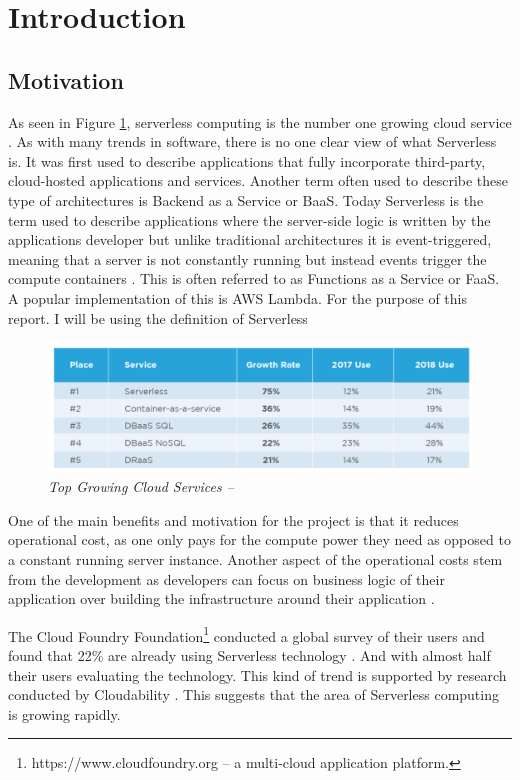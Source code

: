\section{Introduction}
\subsection{Motivation}
\label{sub:motivation}
As seen in Figure \ref{img:strend}, serverless computing is the number one growing cloud service \citep{survey_2018}. As with many trends in software, there is no one clear view of what \gls{Serverless} is. It was first used to describe applications that fully incorporate  third-party, cloud-hosted applications and services. Another term often used to describe these type of architectures is Backend as a Service or \gls{BaaS}. Today \gls{Serverless} is the term used to describe applications where the server-side logic is written by the applications developer but unlike traditional architectures it is event-triggered, meaning that a server is not constantly running but instead events trigger the compute containers \citep{Martin.Fowler}. This is often referred to as Functions as a Service or \gls{FaaS}. A popular implementation of this is \gls{AWS Lambda}. For the purpose of this report. I will be using the \citep{Martin.Fowler} definition of \gls{Serverless}

\begin{figure}[!ht]
\centering
\includegraphics*[width=1\textwidth]{images/a1.png}
\caption{\em Top Growing Cloud Services -- \cite{survey_2018}}
\label{img:strend}
\end{figure}

One of the main benefits and motivation for the project is that it reduces operational cost, as one only pays for the compute power they need as opposed to a constant running server instance. Another aspect of the operational costs stem from the development as developers can focus on business logic of their application over building the infrastructure around their application \citep{Martin.Fowler}. 

The \gls{Cloud Foundry Foundation}\footnote{https://www.cloudfoundry.org -- a multi-cloud application platform.} conducted a global survey of their users and found that 22\% are already using \gls{Serverless} technology \citep{foundry_2018}. And with almost half their users evaluating the technology. This kind of trend is supported by research conducted by Cloudability \citep{report:cloudability}. This suggests that the area of \gls{Serverless} computing is growing rapidly.

